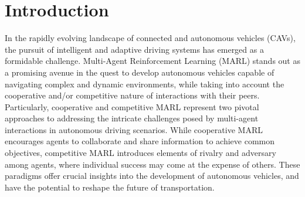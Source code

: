 \documentclass[letterpaper, 10 pt, conference]{ieeeconf}  %
\begin{document}

\section{Introduction}
\label{Section: Introduction}

In the rapidly evolving landscape of connected and autonomous vehicles (CAVs), the pursuit of intelligent and adaptive driving systems has emerged as a formidable challenge. Multi-Agent Reinforcement Learning (MARL) stands out as a promising avenue in the quest to develop autonomous vehicles capable of navigating complex and dynamic environments, while taking into account the cooperative and/or competitive nature of interactions with their peers. Particularly, cooperative and competitive MARL represent two pivotal approaches to addressing the intricate challenges posed by multi-agent interactions in autonomous driving scenarios. While cooperative MARL encourages agents to collaborate and share information to achieve common objectives, competitive MARL introduces elements of rivalry and adversary among agents, where individual success may come at the expense of others. These paradigms offer crucial insights into the development of autonomous vehicles, and have the potential to reshape the future of transportation.
\end{document}
